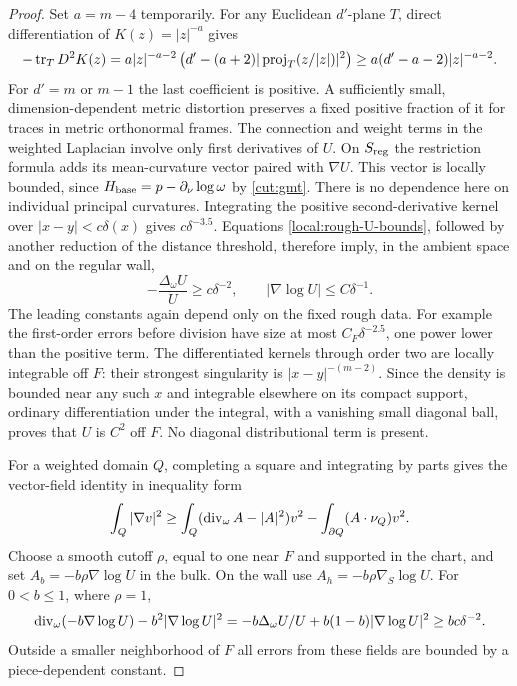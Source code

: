 \begin{proof}
Set $a=m-4$ temporarily.  For any Euclidean $d'$-plane $T$, direct
differentiation of $K(z)=|z|^{-a}$ gives
\[
 -\operatorname{tr}_T D^2K(z)
 =a|z|^{-a-2}\left(d'-(a+2)|\operatorname{proj}_T(z/|z|)|^2\right)
 \ge a(d'-a-2)|z|^{-a-2}.
\]
For $d'=m$ or $m-1$ the last coefficient is positive.  A sufficiently
small, dimension-dependent metric distortion preserves a fixed
positive fraction of it for traces in metric orthonormal frames.
The connection and weight terms in the weighted Laplacian involve
only first derivatives of $U$.  On $S_{\rm reg}$ the restriction
formula adds its mean-curvature vector paired with $\nabla U$.
This vector is locally bounded, since
$H_{\rm base}=p-\partial_\nu\log\omega$ by \cref{cut:gmt}.
There is no dependence here on individual principal curvatures.
Integrating the positive second-derivative kernel over
$|x-y|<c\delta(x)$ gives $c\delta^{-3.5}$.  Equations
\eqref{local:rough-U-bounds}, followed by another reduction of the
distance threshold, therefore imply, in the ambient space and on
the regular wall,
\begin{equation}\label{local:U-superharmonic}
 -\frac{\Delta_\omega U}{U}\ge c\delta^{-2},
 \qquad |\nabla\log U|\le C\delta^{-1}.
\end{equation}
The leading constants again depend only on the fixed rough data.
For example the first-order errors before division have size at
most $C_F\delta^{-2.5}$, one power lower than the positive term.
The differentiated kernels through order two are locally integrable
off $F$: their strongest singularity is $|x-y|^{-(m-2)}$.
Since the density is bounded near any such $x$ and integrable
elsewhere on its compact support, ordinary differentiation under
the integral, with a vanishing small diagonal ball, proves that
$U$ is $C^2$ off $F$.  No diagonal distributional term is present.

For a weighted domain $Q$, completing a square and integrating by
parts gives the vector-field identity in inequality form
\begin{equation}\label{local:vector-hardy}
 \int_Q|\nabla v|^2\ge
 \int_Q(\operatorname{div}_\omega A-|A|^2)v^2
       -\int_{\partial Q}(A\cdot\nu_Q)v^2.
\end{equation}
Choose a smooth cutoff $\rho$, equal to one near $F$ and supported
in the chart, and set $A_b=-b\rho\nabla\log U$ in the bulk.  On the
wall use $A_h=-b\rho\nabla_S\log U$.  For $0<b\le1$, where $\rho=1$,
\[
 \operatorname{div}_\omega(-b\nabla\log U)-b^2|\nabla\log U|^2
 =-b\Delta_\omega U/U+b(1-b)|\nabla\log U|^2
 \ge bc\delta^{-2}.
\]
Outside a smaller neighborhood of $F$ all errors from these fields
are bounded by a piece-dependent constant.


\end{proof}
